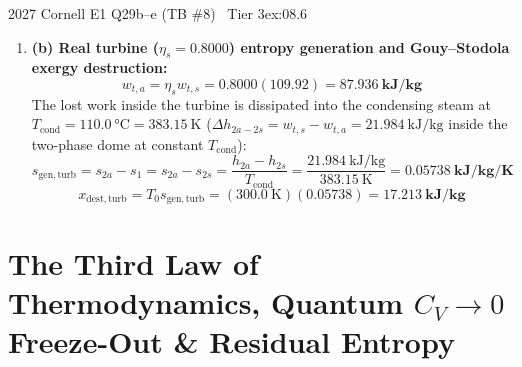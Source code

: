 \begin{workedexample}{2027 Cornell E1 Q29b--e (TB \#8) \textbar\ Tier 3}{ex:08.6}
\begin{enumerate}
\[  \]
  \[
    \eta_{\mathrm{II}} = \frac{w_{t,s}}{x_{\mathrm{in}}} = \frac{109.92}{1128.6} = \frac{\eta_{\mathrm{I}}}{1 - T_0/T_{\mathrm{source}}} = \frac{4.870\%}{0.5000} = \mathbf{9.740\%}
  \]
  \item \textbf{(b) Real turbine ($\eta_s = 0.8000$) entropy generation and Gouy--Stodola exergy destruction:}
  \[
    w_{t,a} = \eta_s w_{t,s} = 0.8000(109.92) = \mathbf{\SI{87.936}{\kilo\joule\per\kilogram}}
  \]
  The lost work inside the turbine is dissipated into the condensing steam at $T_{\mathrm{cond}} = \SI{110.0}{\celsius} = \SI{383.15}{\kelvin}$ ($\Delta h_{2a-2s} = w_{t,s} - w_{t,a} = \SI{21.984}{\kilo\joule\per\kilogram}$ inside the two-phase dome at constant $T_{\mathrm{cond}}$):
  \[
    s_{\mathrm{gen,turb}} = s_{2a} - s_1 = s_{2a} - s_{2s} = \frac{h_{2a} - h_{2s}}{T_{\mathrm{cond}}} = \frac{\SI{21.984}{\kilo\joule\per\kilogram}}{\SI{383.15}{\kelvin}} = \mathbf{\SI{0.05738}{\kilo\joule\per\kilogram\per\kelvin}}
  \]
  \[
    x_{\mathrm{dest,turb}} = T_0 s_{\mathrm{gen,turb}} = (\SI{300.0}{\kelvin})(0.05738) = \mathbf{\SI{17.213}{\kilo\joule\per\kilogram}}
  \]
\end{enumerate}
\end{workedexample}

\section{The Third Law of Thermodynamics, Quantum $C_V \to 0$ Freeze-Out \& Residual Entropy}\label{sec:08.7}

